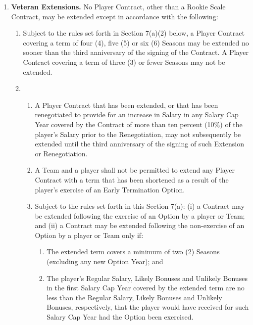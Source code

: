 \documentclass[
]{book}
\providecommand{\tightlist}{%
  \setlength{\itemsep}{0pt}\setlength{\parskip}{0pt}}
\begin{document}
\begin{enumerate}
\def\labelenumi{(\alph{enumi})}
\tightlist
\item
  \textbf{Veteran Extensions.} No Player Contract, other than a Rookie Scale Contract, may be extended except in accordance with the following:

  \begin{enumerate}
  \def\labelenumii{(\arabic{enumii})}
  \item
    Subject to the rules set forth in Section 7(a)(2) below, a Player Contract covering a term of four (4), five (5) or six (6) Seasons may be extended no sooner than the third anniversary of the signing of the Contract. A Player Contract covering a term of three (3) or fewer Seasons may not be extended.
  \item
    \begin{enumerate}
    \def\labelenumiii{(\roman{enumiii})}
    \tightlist
    \item
      A Player Contract that has been extended, or that has been renegotiated to provide for an increase in Salary in any Salary Cap Year covered by the Contract of more than ten percent (10\%) of the player's Salary prior to the Renegotiation, may not subsequently be extended until the third anniversary of the signing of such Extension or Renegotiation.
    \item
      A Team and a player shall not be permitted to extend any Player Contract with a term that has been shortened as a result of the player's exercise of an Early Termination Option.
    \item
      Subject to the rules set forth in this Section 7(a): (i) a Contract may be extended following the exercise of an Option by a player or Team; and (ii) a Contract may be extended following the non-exercise of an Option by a player or Team only if:

      \begin{enumerate}
      \def\labelenumiv{(\Alph{enumiv})}
      \tightlist
      \item
        The extended term covers a minimum of two (2) Seasons (excluding any new Option Year); and
      \item
        The player's Regular Salary, Likely Bonuses and Unlikely Bonuses in the first Salary Cap Year covered by the extended term are no less than the Regular Salary, Likely Bonuses and Unlikely Bonuses, respectively, that the player would have received for such Salary Cap Year had the Option been exercised.
      \end{enumerate}


\end{enumerate}
\end{enumerate}
\end{enumerate}
\end{document}
